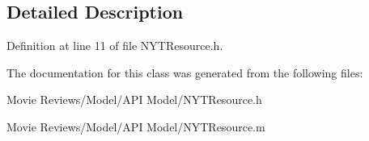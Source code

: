 \subsection{Detailed Description}


Definition at line 11 of file N\+Y\+T\+Resource.\+h.



The documentation for this class was generated from the following files\+:\begin{DoxyCompactItemize}
\item 
Movie Reviews/\+Model/\+A\+P\+I Model/N\+Y\+T\+Resource.\+h\item 
Movie Reviews/\+Model/\+A\+P\+I Model/N\+Y\+T\+Resource.\+m\end{DoxyCompactItemize}
